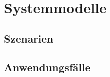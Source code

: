 \documentclass[a4paper,12pt]{article}
\begin{document}
\section{Systemmodelle}
\subsection{Szenarien}
\subsection{Anwendungsfälle}

\clearpage
 
\end{document}

